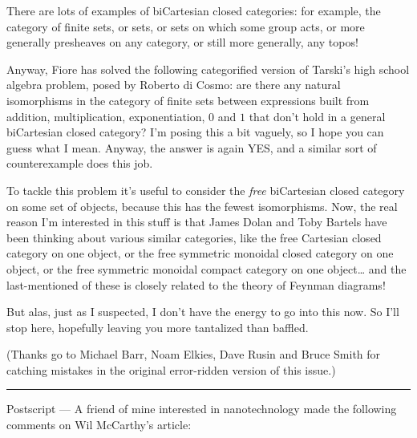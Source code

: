 \documentclass{article}
\begin{document}
There are lots of examples of biCartesian closed categories: for
example, the category of finite sets, or sets, or sets on which some
group acts, or more generally presheaves on any category, or still more
generally, any topos!

Anyway, Fiore has solved the following categorified version of Tarski's
high school algebra problem, posed by Roberto di Cosmo: are there any
natural isomorphisms in the category of finite sets between expressions
built from addition, multiplication, exponentiation, \(0\) and \(1\)
that don't hold in a general biCartesian closed category? I'm posing
this a bit vaguely, so I hope you can guess what I mean. Anyway, the
answer is again YES, and a similar sort of counterexample does this job.

To tackle this problem it's useful to consider the \emph{free}
biCartesian closed category on some set of objects, because this has the
fewest isomorphisms. Now, the real reason I'm interested in this stuff
is that James Dolan and Toby Bartels have been thinking about various
similar categories, like the free Cartesian closed category on one
object, or the free symmetric monoidal closed category on one object, or
the free symmetric monoidal compact category on one object\ldots{} and
the last-mentioned of these is closely related to the theory of Feynman
diagrams!

But alas, just as I suspected, I don't have the energy to go into this
now. So I'll stop here, hopefully leaving you more tantalized than
baffled.

(Thanks go to Michael Barr, Noam Elkies, Dave Rusin and Bruce Smith for
catching mistakes in the original error-ridden version of this issue.)

\begin{center}\rule{0.5\linewidth}{0.5pt}\end{center}

Postscript --- A friend of mine interested in nanotechnology made the
following comments on Wil McCarthy's article:
\end{document}
